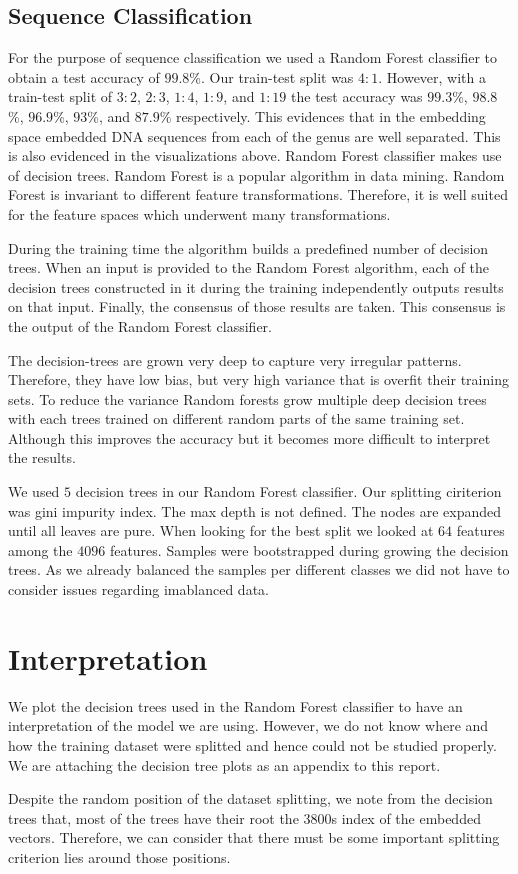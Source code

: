 \documentclass[oneside, twocolumn, a4paper, 10pt]{IEEEtran}
\begin{document}
\subsection{Sequence Classification}
For the purpose of sequence classification we used a Random Forest classifier to obtain a test accuracy of $99.8$\%. Our train-test split was $4:1$. However, with a train-test split of $3:2$, $2:3$, $1:4$, $1:9$, and $1:19$ the test accuracy was $99.3$\%, $98.8$\%, $96.9$\%, $93$\%, and $87.9$\% respectively. This evidences that in the embedding space embedded DNA sequences from each of the genus are well separated. This is also evidenced in the visualizations above. Random Forest classifier makes use of decision trees. Random Forest is a popular algorithm in data mining. Random Forest is invariant to different feature transformations. Therefore, it is well suited for the feature spaces which underwent many transformations.\\
\par
During the training time the algorithm builds a predefined number of decision trees. When an input is provided to the Random Forest algorithm, each of the decision trees constructed in it during the training independently outputs results on that input. Finally, the consensus of those results are taken. This consensus is the output of the Random Forest classifier.\\
\par 
The decision-trees are grown very deep to capture very irregular patterns. Therefore, they have low bias, but very high variance that is overfit their training sets. To reduce the variance Random forests grow multiple deep decision trees with each trees trained on different random parts of the same training set. Although this improves the accuracy but it becomes more difficult to interpret the results.\\
\par 
We used $5$ decision trees in our Random Forest classifier. Our splitting ciriterion was gini impurity index. The max depth is not defined. The nodes are expanded until all leaves are pure. When looking for the best split we looked at $64$ features among the $4096$ features. Samples were bootstrapped during growing the decision trees. As we already balanced the samples per different classes we did not have to consider issues regarding imablanced data. 
\section{Interpretation} 
We plot the decision trees used in the Random Forest classifier to have an interpretation of the model we are using. However, we do not know where and how the training dataset were splitted and hence could not be studied properly. We are attaching the decision tree plots as an appendix to this report.\\
\par 
Despite the random position of the dataset splitting, we note from the decision trees that, most of the trees have their root the $3800$s index of the embedded vectors. Therefore, we can consider that there must be some important splitting criterion lies around those positions.
\end{document}
